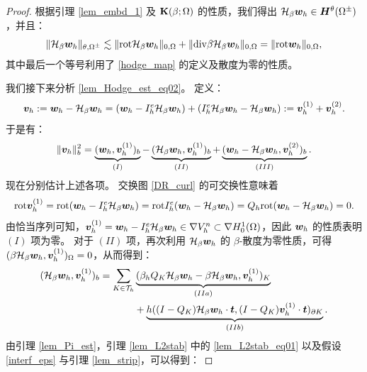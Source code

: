 \begin{proof}
根据引理 \ref{lem_embd_1} 及 $\mathbf{K}(\beta;\Omega)$ 的性质，我们得出 $\mathcal{H}_{\beta}\boldsymbol{w}_h\in \boldsymbol{H}^{\theta}(\Omega^{\pm})$，并且：
$$
\|  \mathcal{H}_{\beta}\boldsymbol{w}_h  \|_{\theta,\Omega^{\pm}} \lesssim \| \mathrm{rot}  \mathcal{H}_{\beta}\boldsymbol{w}_h \|_{0,\Omega} + \| \mathrm{div} \beta \mathcal{H}_{\beta}\boldsymbol{w}_h \|_{0,\Omega} =  \| \mathrm{rot} \boldsymbol{w}_h \|_{0,\Omega},
$$
其中最后一个等号利用了 \eqref{hodge_map} 的定义及散度为零的性质。

我们接下来分析 \eqref{lem_Hodge_est_eq02}。
定义：
$$
\boldsymbol{v}_h := \boldsymbol{w}_h - \mathcal{H}_{\beta}\boldsymbol{w}_h = (\boldsymbol{w}_h - I^e_h
\mathcal{H}_{\beta}\boldsymbol{w}_h)+(I^e_h \mathcal{H}_{\beta}\boldsymbol{w}_h -
\mathcal{H}_{\beta}\boldsymbol{w}_h):= \boldsymbol{v}^{(1)}_h + \boldsymbol{v}^{(2)}_h.
$$
于是有：
\begin{equation}
\begin{split}
\label{lem_Hodge_est_eq5}
\| \boldsymbol{v}_h \|^2_b =  \underbrace{(  \boldsymbol{w}_h , \boldsymbol{v}^{(1)}_h )_{b} }_{(I)} -
\underbrace{ (   \mathcal{H}_{\beta}\boldsymbol{w}_h , \boldsymbol{v}^{(1)}_h )_{b}}_{(II)}  +
\underbrace{ (  \boldsymbol{w}_h - \mathcal{H}_{\beta}\boldsymbol{w}_h , \boldsymbol{v}^{(2)}_h )_{b} }_{(III)}.
\end{split}
\end{equation}
现在分别估计上述各项。
交换图 \eqref{DR_curl} 的可交换性意味着
\begin{equation}
\label{lem_Hodge_est_eq3}
\mathrm{rot} \boldsymbol{v}^{(1)}_h = \mathrm{rot}( \boldsymbol{w}_h - I^e_h\mathcal{H}_{\beta}\boldsymbol{w}_h ) = \mathrm{rot} I^e_h(
\boldsymbol{w}_h - \mathcal{H}_{\beta}\boldsymbol{w}_h ) = Q_h \mathrm{rot}( \boldsymbol{w}_h - \mathcal{H}_{\beta}\boldsymbol{w}_h
) =0.
\end{equation}
由恰当序列可知，$\boldsymbol{v}^{(1)}_h = \boldsymbol{w}_h - I^e_h\mathcal{H}_{\beta}\boldsymbol{w}_h\in
\nabla V^n_h\subset \nabla H^1_0(\Omega)$，因此 $\boldsymbol{w}_h$ 的性质表明 $(I)$ 项为零。
对于 $(II)$ 项，再次利用 $\mathcal{H}_{\beta}\boldsymbol{w}_h$ 的 $\beta$-散度为零性质，可得 $(\beta \mathcal{H}_{\beta}\boldsymbol{w}_h, \boldsymbol{v}_h^{(1)})_{\Omega}=0$，从而得到：
\begin{equation*}
\begin{split}
\label{lem_Hodge_est_eq4}
( \mathcal{H}_{\beta}\boldsymbol{w}_h, \boldsymbol{v}^{(1)}_h)_{b} = \sum_{K\in\mathcal{T}_h}
& \underbrace{ ( \beta_h Q_K \mathcal{H}_{\beta}\boldsymbol{w}_h - \beta
\mathcal{H}_{\beta}\boldsymbol{w}_h,  \boldsymbol{v}^{(1)}_h)_{K} }_{(IIa)} \\
& +  \underbrace{ h ( (I-Q_K)\mathcal{H}_{\beta}\boldsymbol{w}_h\cdot\boldsymbol{t},
(I-Q_K)\boldsymbol{v}^{(1)}_h\cdot\boldsymbol{t} )_{\partial K} }_{(IIb)}.
\end{split}
\end{equation*}
由引理 \ref{lem_Pi_est}，引理 \ref{lem_L2stab} 中的 \eqref{lem_L2stab_eq01}
以及假设 \ref{interf_eps} 与引理 \ref{lem_strip}，可以得到：

\end{proof}

